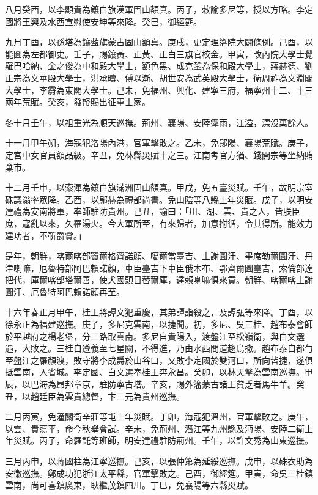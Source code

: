 \begin{pinyinscope}
八月癸酉，以李顯貴為鑲白旗漢軍固山額真。丙子，敕諭多尼等，授以方略。李定國將王興及水西宣慰使安坤等來降。癸巳，御經筵。

九月丁酉，以孫塔為鑲藍旗蒙古固山額真。庚戌，更定理籓院大闢條例。己酉，以能圖為左都御史。壬子，賜鑲黃、正黃、正白三旗官校金。甲寅，改內院大學士覺羅巴哈納、金之俊為中和殿大學士，額色黑、成克鞏為保和殿大學士，蔣赫德、劉正宗為文華殿大學士，洪承疇、傅以漸、胡世安為武英殿大學士，衛周祚為文淵閣大學士，李霨為東閣大學士。己未，免福州、興化、建寧三府，福寧州十二、十三兩年荒賦。癸亥，發帑賜出征軍士家。

冬十月壬午，以祖重光為順天巡撫。荊州、襄陽、安陸霪雨，江溢，漂沒萬餘人。

十一月甲午朔，海寇犯洛陽內港，官軍擊敗之。乙未，免鄖陽、襄陽荒賦。庚子，定宮中女官員額品級。辛丑，免林縣災賦十之三。江南考官方猶、錢開宗等坐納賄棄市。

十二月壬申，以索渾為鑲白旗滿洲固山額真。甲戌，免五臺災賦。壬午，故明宗室硃議滃率眾降。乙酉，以鄔赫為禮部尚書。免山陰等八縣上年災賦。戊子，以明安達禮為安南將軍，率師駐防貴州。己丑，諭曰：「川、湖、雲、貴之人，皆朕臣庶，寇亂以來，久罹湯火。今大軍所至，有來歸者，加意拊循，令其得所。能效力建功者，不靳爵賞。」

是年，朝鮮，喀爾喀部竇爾格齊諾顏、噶爾當臺吉、土謝圖汗、畢席勒爾圖汗、丹津喇嘛，厄魯特部阿巴賴諾顏，車臣臺吉下車臣俄木布、鄂齊爾圖臺吉，索倫部達把代，庫爾喀部塔爾善，使犬國頭目替爾庫，達賴喇嘛俱來貢。朝鮮、喀爾喀土謝圖汗、厄魯特阿巴賴諾顏再至。

十六年春正月甲午，桂王將譚文犯重慶，其弟譚詣殺之，及譚弘等來降。丁酉，以徐永正為福建巡撫。庚子，多尼克雲南，以捷聞。初，多尼、吳三桂、趙布泰會師於平越府之楊老堡，分三路取雲南。多尼自貴陽入，渡盤江至松嶺衛，與白文選遇，大敗之。三桂自遵義至七星關，不得進，乃由水西間道趨烏撒。趙布泰自都勻至盤江之羅顏渡，敗守將李成爵於山谷口，又敗李定國於雙河口，所向皆捷，遂俱抵雲南，入省城。李定國、白文選奉桂王奔永昌。癸卯，以林天擎為雲南巡撫。甲辰，以巴海為昂邦章京，駐防寧古塔。辛亥，賜外籓蒙古諸王貧乏者馬牛羊。癸丑，以趙廷臣為雲貴總督，卞三元為貴州巡撫。

二月丙寅，免潼關衛辛莊等屯上年災賦。丁卯，海寇犯溫州，官軍擊敗之。庚午，以雲、貴蕩平，命今秋舉會試。辛未，免荊州、潛江等九州縣及沔陽、安陸二衛上年災賦。丙子，命羅託等班師，明安達禮駐防荊州。壬午，以許文秀為山東巡撫。

三月丙申，以蔣國柱為江寧巡撫。己亥，以張仲第為延綏巡撫。戊申，以硃衣助為安徽巡撫。鄭成功犯浙江太平縣，官軍擊敗之。己酉，御經筵。甲寅，命吳三桂鎮雲南，尚可喜鎮廣東，耿繼茂鎮四川。丁巳，免襄陽等六縣災賦。


\end{pinyinscope}
